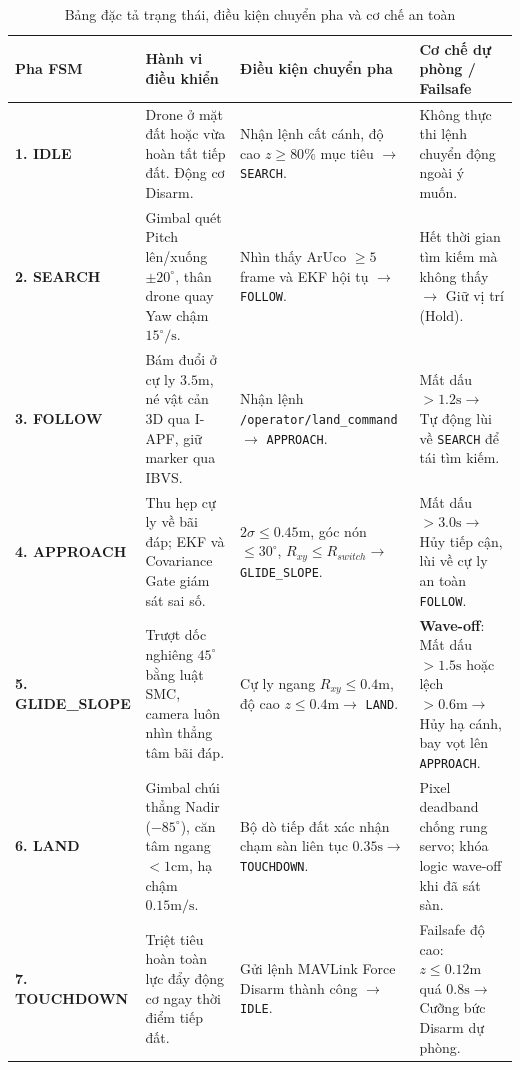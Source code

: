 \documentclass[12pt,a4paper]{article}
\begin{document}
\begin{table}[h!]
\centering
\small
\begin{tabularx}{\textwidth}{@{}l p{3.8cm} X X@{}}
\toprule
\textbf{Pha FSM} & \textbf{Hành vi điều khiển} & \textbf{Điều kiện chuyển pha} & \textbf{Cơ chế dự phòng / Failsafe} \\ \midrule
\textbf{1. IDLE} & Drone ở mặt đất hoặc vừa hoàn tất tiếp đất. Động cơ Disarm. & Nhận lệnh cất cánh, độ cao $z \ge 80\%$ mục tiêu $\to$ \texttt{SEARCH}. & Không thực thi lệnh chuyển động ngoài ý muốn. \\ \midrule
\textbf{2. SEARCH} & Gimbal quét Pitch lên/xuống $\pm 20^\circ$, thân drone quay Yaw chậm $15^\circ/\text{s}$. & Nhìn thấy ArUco $\ge 5$ frame và EKF hội tụ $\to$ \texttt{FOLLOW}. & Hết thời gian tìm kiếm mà không thấy $\to$ Giữ vị trí (Hold). \\ \midrule
\textbf{3. FOLLOW} & Bám đuổi ở cự ly $3.5\text{m}$, né vật cản 3D qua I-APF, giữ marker qua IBVS. & Nhận lệnh \texttt{/operator/land\_command} $\to$ \texttt{APPROACH}. & Mất dấu $> 1.2\text{s} \to$ Tự động lùi về \texttt{SEARCH} để tái tìm kiếm. \\ \midrule
\textbf{4. APPROACH} & Thu hẹp cự ly về bãi đáp; EKF và Covariance Gate giám sát sai số. & $2\sigma \le 0.45\text{m}$, góc nón $\le 30^\circ$, $R_{xy} \le R_{switch} \to$ \texttt{GLIDE\_SLOPE}. & Mất dấu $> 3.0\text{s} \to$ Hủy tiếp cận, lùi về cự ly an toàn \texttt{FOLLOW}. \\ \midrule
\textbf{5. GLIDE\_SLOPE} & Trượt dốc nghiêng $45^\circ$ bằng luật SMC, camera luôn nhìn thẳng tâm bãi đáp. & Cự ly ngang $R_{xy} \le 0.4\text{m}$, độ cao $z \le 0.4\text{m} \to$ \texttt{LAND}. & \textbf{Wave-off}: Mất dấu $> 1.5\text{s}$ hoặc lệch $> 0.6\text{m} \to$ Hủy hạ cánh, bay vọt lên \texttt{APPROACH}. \\ \midrule
\textbf{6. LAND} & Gimbal chúi thẳng Nadir ($-85^\circ$), căn tâm ngang $< 1\text{cm}$, hạ chậm $0.15\text{m/s}$. & Bộ dò tiếp đất xác nhận chạm sàn liên tục $0.35\text{s} \to$ \texttt{TOUCHDOWN}. & Pixel deadband chống rung servo; khóa logic wave-off khi đã sát sàn. \\ \midrule
\textbf{7. TOUCHDOWN} & Triệt tiêu hoàn toàn lực đẩy động cơ ngay thời điểm tiếp đất. & Gửi lệnh MAVLink Force Disarm thành công $\to$ \texttt{IDLE}. & Failsafe độ cao: $z \le 0.12\text{m}$ quá $0.8\text{s} \to$ Cưỡng bức Disarm dự phòng. \\ \bottomrule
\end{tabularx}
\caption{Bảng đặc tả trạng thái, điều kiện chuyển pha và cơ chế an toàn}
\label{tab:fsm_states}
\end{table}
\end{document}
